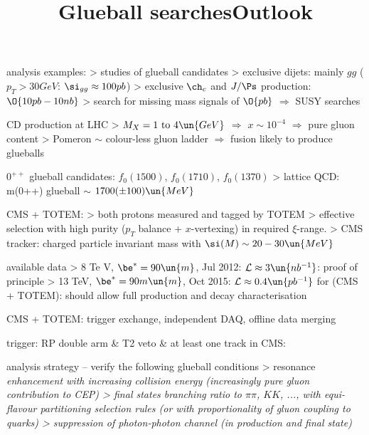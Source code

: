 \> analysis examples:
\>> studies of glueball candidates
\>> exclusive dijets: mainly $gg$ ($p_T > 30GeV$: $\si_{gg} \approx 100 pb$)
\>> exclusive $\ch_{c}$ and $J/\Ps$ production: $\O{10 pb - 10 nb}$
\>> search for missing mass signals of $\O{pb}$ $\Rightarrow$ SUSY searches

\newpage %
\title{Glueball searches}

\> CD production at LHC
\>> $M_X = 1\hbox{ to }4\un{GeV}$ $\Rightarrow$ $x\sim 10^{-4}$ $\Rightarrow$ pure gluon content
\>> Pomeron $\sim$ colour-less gluon ladder $\Rightarrow$ fusion likely to produce glueballs

\> $0^{++}$ glueball candidates: $f_0(1500)$, $f_0(1710)$, $f_0(1370)$
\>> lattice QCD: m(0++) glueball $\sim$ $1700 (\pm 100)\un{MeV}$

\> CMS + TOTEM:
\>> both protons measured and tagged by TOTEM
\>> effective selection with high purity ($p_T$ balance + $x$-vertexing) in required $\xi$-range.
\>> CMS tracker: charged particle invariant mass with $\si(M) \sim 20-30\un{MeV}$

\> available data
\>> 8 Te	V, $\be^* = 90\un{m}$, Jul 2012: ${\cal L} \approx 3\un{nb^{-1}}$: proof of principle
\>> 13 TeV, $\be^* = 90m\un{m}$, Oct 2015: ${\cal L} \approx 0.4\un{pb^{-1}}$ for (CMS + TOTEM): should allow full production and decay characterisation


\newpage %

\> CMS + TOTEM: trigger exchange, independent DAQ, offline data merging

\> trigger: RP double arm \& T2 veto \& at least one track in CMS:

\centerline{}

\> analysis strategy -- verify the following glueball conditions
\>> resonance \em{enhancement with increasing collision} energy (increasingly pure gluon contribution to CEP)
\>> final states \em{branching ratio to $\pi\pi$, $KK$, ...},  with equi-flavour partitioning selection rules (or with proportionality of
gluon coupling to quarks)
\>> \em{suppression of photon-photon} channel (in production and final state)



\newpage %
\title{Outlook}

